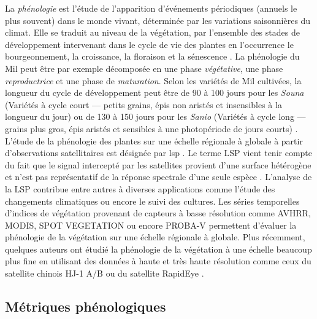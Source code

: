 La \emph{phénologie} 
est l’étude de l’apparition d’événements périodiques (annuels le plus souvent) dans le monde vivant, déterminée par les variations saisonnières du climat. Elle se traduit au niveau de 
la végétation, par l’ensemble des stades de développement intervenant dans le cycle de vie des plantes en l’occurrence le bourgeonnement, la croissance, la floraison et la 
sénescence \citep{Kimball2014}. La phénologie du Mil peut être par exemple décomposée en une phase \emph{végétative}, une phase \emph{reproductrice} et une phase de 
\emph{maturation}. Selon les variétés de Mil cultivées, la longueur du cycle de développement peut être de 90 à 100 jours pour les \emph{Souna} (Variétés à cycle court --- 
petits grains, épis non aristés et insensibles à la longueur du jour) ou de 130 à 150 jours pour les \emph{Sanio} (Variétés à cycle long --- grains plus gros, épis aristés et sensibles
à une photopériode de jours courts) \citep{Diouf2001}.
\\L'\'etude de la phénologie des plantes sur une échelle régionale à globale à partir d’observations satellitaires est désignée par \acrfull{lsp} \citep{Helman2018}. Le terme LSP 
vient tenir compte du fait que le signal intercepté par les satellites provient d’une surface hétérogène et n’est pas représentatif de la réponse spectrale d’une seule espèce 
\citep{Kimball2014}. L'analyse de la LSP contribue entre autres à diverses applications comme l’étude des changements climatiques \citep{Begue2014} ou encore le suivi des
cultures. Les séries temporelles d’indices de végétation provenant de capteurs à basse résolution comme AVHRR, MODIS, SPOT VEGETATION ou encore PROBA-V permettent d’évaluer 
la phénologie de la végétation sur une échelle régionale à globale. Plus récemment, quelques auteurs ont étudié la phénologie de la végétation à une échelle beaucoup plus fine en utilisant des données
à haute et très haute résolution comme ceux du satellite chinois HJ-1 A/B \citep{Pan2015} ou du satellite RapidEye \citep{Vrieling2017}.

  \subsection{Métriques phénologiques}


